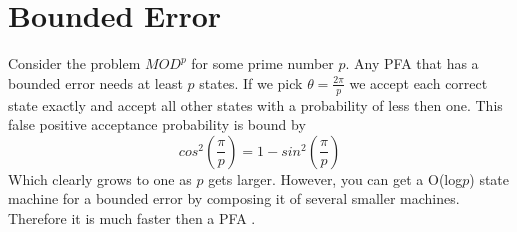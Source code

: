 \documentclass[letter, 12pt]{article}
\begin{document}
\section{Bounded Error}
Consider the problem $MOD^p$ for some prime number $p$.  Any PFA that has a bounded error needs at least $p$ states.  If we pick $\theta = \frac{2\pi}{p}$ we accept each correct state exactly and accept all other states with a probability of less then one.  This false positive acceptance probability is bound by 
$$
cos^2(\frac{\pi}{p}) = 1 - sin^2(\frac{\pi}{p})
$$
Which clearly grows to one as $p$ gets larger.  However, you can get a O(log$p$) state machine for a bounded error by composing it of several smaller machines.  Therefore it is much faster then a PFA \cite{moddern}.    







\end{document}
